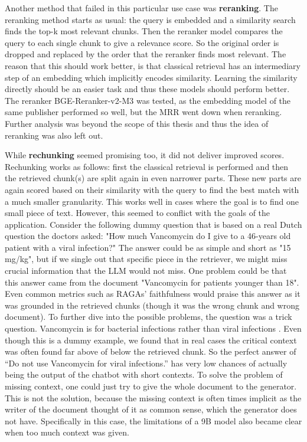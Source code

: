 Another method that failed in this particular use case was \textbf{reranking}. The reranking method starts as usual: the query is embedded and a similarity search finds the top-k most relevant chunks. Then the reranker model compares the query to each single chunk to give a relevance score. So the original order is dropped and replaced by the order that the reranker finds most relevant. The reason that this should work better, is that classical retrieval has an intermediary step of an embedding which implicitly encodes similarity. Learning the similarity directly should be an easier task and thus these models should perform better. The reranker BGE-Reranker-v2-M3 \cite{chen2024bge} was tested, as the embedding model of the same publisher performed so well, but the MRR went down when reranking. Further analysis was beyond the scope of this thesis and thus the idea of reranking was also left out.

While \textbf{rechunking} seemed promising too, it did not deliver improved scores. Rechunking works as follows: first the classical retrieval is performed and then the retrieved chunk(s) are split again in even narrower parts. These new parts are again scored based on their similarity with the query to find the best match with a much smaller granularity. This works well in cases where the goal is to find one small piece of text. However, this seemed to conflict with the goals of the application. Consider the following dummy question that is based on a real Dutch question the doctors asked: "How much Vancomycin do I give to a 46-years old patient with a viral infection?" The answer could be as simple and short as "15 mg/kg", but if we single out that specific piece in the retriever, we might miss crucial information that the LLM would not miss. One problem could be that this answer came from the document "Vancomycin for patients younger than 18". Even common metrics such as RAGAs' \cite{es2024ragas} faithfulness would praise this answer as it was grounded in the retrieved chunks (though it was the wrong chunk and wrong document). To further dive into the possible problems, the question was a trick question. Vancomycin is for bacterial infections rather than viral infections \cite{vancomycin_wikipedia}. Even though this is a dummy example, we found that in real cases the critical context was often found far above of below the retrieved chunk. So the perfect answer of ``Do not use Vancomycin for viral infections.'' has very low chances of actually being the output of the chatbot with short contexts. To solve the problem of missing context, one could just try to give the whole document to the generator. This is not the solution, because the missing context is often times implicit as the writer of the document thought of it as common sense, which the generator does not have. Specifically in this case, the limitations of a 9B model also became clear when too much context was given.

